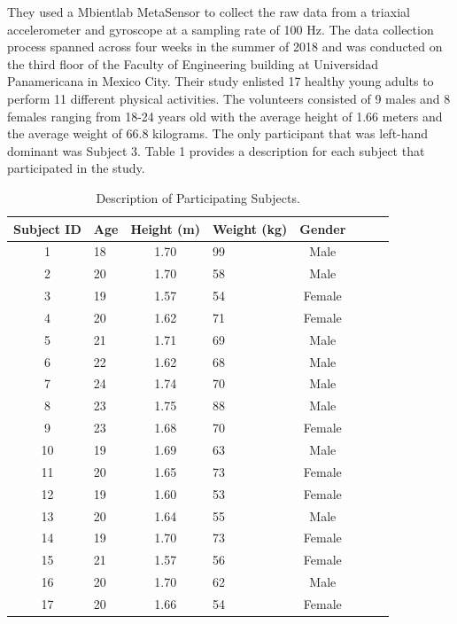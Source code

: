 \documentclass{llncs}
\begin{document}
	They used a Mbientlab MetaSensor to collect the raw data from a triaxial accelerometer and gyroscope at a sampling rate of 100 Hz. The data collection process spanned across four weeks in the summer of 2018 and was conducted on the third floor of the Faculty of Engineering building at Universidad Panamericana in Mexico City. \cite{martinez2019up} Their study enlisted 17 healthy young adults to perform 11 different physical activities. The volunteers consisted of 9 males and 8 females ranging from 18-24 years old with the average height of 1.66 meters and the average weight of 66.8 kilograms. The only participant that was left-hand dominant was Subject 3. Table 1 provides a description for each subject that participated in the study.
	
\begin{table}[h!]
	\begin{center}
		\caption{Description of Participating Subjects.}\label{table1}
		\begin{tabular}{clclclc|c}
			\toprule
			Subject ID & Age & Height (m) & Weight (kg) & Gender\\
			\midrule
			1 &  18 & 1.70 & 99 & Male\\
			2 &  20 & 1.70 & 58 & Male\\
			3 & 19 & 1.57 & 54 & Female\\
			4 & 20 & 1.62 & 71 & Female\\
			5 & 21 & 1.71 & 69 & Male\\
			6 & 22 & 1.62 & 68 & Male\\
			7 & 24 & 1.74 & 70 & Male\\
			8 & 23 & 1.75 & 88 & Male\\
			9 & 23 & 1.68 & 70 & Female\\
			10 & 19 & 1.69 & 63 & Male\\
			11 & 20 & 1.65 & 73 & Female\\
			12 & 19 & 1.60 & 53 & Female\\
			13 & 20 & 1.64 & 55 & Male\\
			14 & 19 & 1.70 & 73 & Female\\
			15 & 21 & 1.57 & 56 & Female\\
			16 & 20 & 1.70 & 62 & Male\\
			17 & 20 & 1.66 & 54 & Female\\
			\bottomrule
		\end{tabular}
	\end{center}
\end{table}
\end{document}
